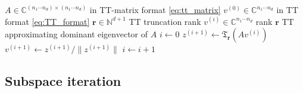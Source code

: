 \documentclass[10pt,preprint]{elsarticle}
\begin{document}
\begin{algorithm}
\caption{Power iteration with rank truncation}
\label{alg:truncated_power}
\begin{algorithmic}[1]
\Require 
\Statex \hspace{1em} $A \in \mathbb{C}^{(n_1 \cdots n_d) \times (n_1 \cdots n_d)}$ in TT-matrix format \eqref{eq:tt_matrix}
\Statex \hspace{1em} $v^{(0)} \in \mathbb{C}^{n_1 \cdots n_d}$ in TT format \eqref{eq:TT_format}
\Statex \hspace{1em} $\bm r \in \mathbb{N}^{d+1}$ TT truncation rank
\Ensure
\Statex \hspace{1em} $v^{(i)} \in \mathbb{C}^{n_1 \cdots n_d}$ rank $\bm r$ TT approximating dominant eigenvector of $A$
\vspace{0.5em}
\State $i \gets 0$
\Repeat
    \State $z^{(i+1)} \gets \mathfrak{T}_{\bm r}\!\left( A v^{(i)} \right)$ 
    \State $v^{(i+1)} \gets z^{(i+1)} / \lVert z^{(i+1)} \rVert$ 
    \State $i \gets i+1$
\end{algorithmic}
\end{algorithm}

\subsection{Subspace iteration} 
\end{document}
